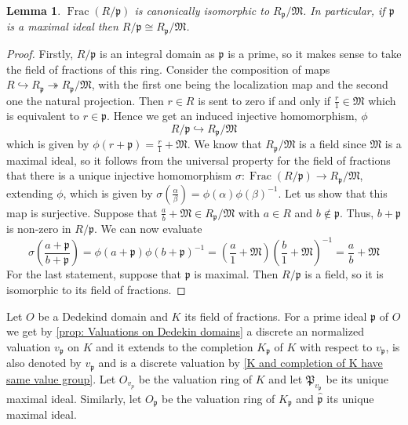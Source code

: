 \documentclass{article}
\DeclareMathOperator{\Frac}{Frac}
\newtheorem{lemma}{Lemma}[section]
\newcommand{\mfrak}[1]{\mathfrak{#1}}
\newcommand{\vp}{{v_{\mfrak p}}}
\numberwithin{equation}{section}
\begin{document}
\begin{lemma} \label{lem: Canonical localization isomorphism}
    $\Frac(R / \mfrak p)$ is canonically isomorphic to $R_\mfrak p / \mfrak M$. In particular, if $\mfrak p$ is a maximal ideal then $R / \mfrak p \cong R_\mfrak p / \mfrak M$.
\end{lemma}
\begin{proof}
    Firstly, $R / \mfrak p$ is an integral domain as $\mfrak p$ is a prime, so it makes sense to take the field of fractions of this ring. Consider the composition of maps $R \hookrightarrow R_\mfrak p \twoheadrightarrow R_\mfrak p / \mfrak M$, with the first one being the localization map and the second one the natural projection. Then $r \in R$ is sent to zero if and only if $\frac{r}{1} \in \mfrak M$ which is equivalent to $r \in \mfrak p$. Hence we get an induced injective homomorphism, $\phi$
    $$R / \mfrak p \hookrightarrow R_\mfrak p / \mfrak M$$
    which is given by $\phi(r + \mfrak p) = \frac{r}{1} + \mfrak M$. We know that $R_\mfrak p / \mfrak M$ is a field since $\mfrak M$ is a maximal ideal, so it follows from the universal property for the field of fractions that there is a unique injective homomorphism $\sigma : \Frac(R / \mfrak p) \to R_\mfrak p / \mfrak M$, extending $\phi$, which is given by $\sigma(\frac{\alpha}{\beta}) = \phi(\alpha)\phi(\beta)^{-1}$. Let us show that this map is surjective. Suppose that $\frac{a}{b} + \mfrak M  \in R_\mfrak p / \mfrak M$ with $a \in R$ and $b \notin \mfrak p$. Thus, $b + \mfrak p$ is non-zero in $R / \mfrak p$. We can now evaluate
    $$\sigma(\frac{a + \mfrak p}{b + \mfrak p}) = \phi(a + \mfrak p)\phi(b + \mfrak p)^{-1} = (\frac{a}{1} + \mfrak M) (\frac{b}{1} + \mfrak M)^{-1} = \frac{a}{b} + \mfrak M$$
    For the last statement, suppose that $\mfrak p$ is maximal. Then $R / \mfrak p$ is a field, so it is isomorphic to its field of fractions.
\end{proof}

Let $O$ be a Dedekind domain and $K$ its field of fractions. For a prime ideal $\mfrak p$ of $O$ we get by \cref{prop: Valuations on Dedekin domains} a discrete an normalized valuation $\vp$ on $K$ and it extends to the completion $K_\mfrak{p}$ of $K$ with respect to $v_\mfrak{p}$, is also denoted by $v_\mfrak{p}$ and is a discrete valuation by \cref{K and completion of K have same value group}. Let $O_{v_p}$ be the valuation ring of $K$ and let $\mfrak{P}_{v_\mfrak{p}}$ be its unique maximal ideal. Similarly, let $O_\mfrak{p}$ be the valuation ring of $K_\mfrak{p}$ and $\hat{\mfrak{p}}$ its unique maximal ideal.
\end{document}
